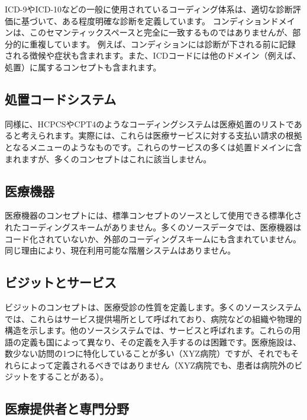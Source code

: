 \documentclass[
  11pt]{book}
\theoremstyle{definition}
\theoremstyle{definition}
\theoremstyle{definition}
\theoremstyle{definition}
\theoremstyle{remark}
\begin{document}
ICD-9やICD-10などの一般に使用されているコーディング体系は、適切な診断評価に基づいて、ある程度明確な診断を定義しています。 コンディションドメインは、このセマンティックスペースと完全に一致するものではありませんが、部分的に重複しています。 例えば、コンディションには診断が下される前に記録される徴候や症状も含まれます。また、ICDコードには他のドメイン（例えば、処置）に属するコンセプトも含まれます。

\subsection{処置コードシステム}\label{ux51e6ux7f6eux30b3ux30fcux30c9ux30b7ux30b9ux30c6ux30e0}

同様に、HCPCSやCPT4のようなコーディングシステムは医療処置のリストであると考えられます。実際には、これらは医療サービスに対する支払い請求の根拠となるメニューのようなものです。これらのサービスの多くは処置ドメインに含まれますが、多くのコンセプトはこれに該当しません。

\subsection{医療機器}\label{ux533bux7642ux6a5fux5668}

医療機器のコンセプトには、標準コンセプトのソースとして使用できる標準化されたコーディングスキームがありません。多くのソースデータでは、医療機器はコード化されていないか、外部のコーディングスキームにも含まれていません。同じ理由により、現在利用可能な階層システムはありません。

\subsection{ビジットとサービス}\label{ux30d3ux30b8ux30c3ux30c8ux3068ux30b5ux30fcux30d3ux30b9}

ビジットのコンセプトは、医療受診の性質を定義します。多くのソースシステムでは、これらはサービス提供場所として呼ばれており、病院などの組織や物理的構造を示します。他のソースシステムでは、サービスと呼ばれます。これらの用語の定義も国によって異なり、その定義を入手するのは困難です。医療施設は、数少ない訪問の1つに特化していることが多い（XYZ病院）ですが、それでもそれらによって定義されるべきではありません（XYZ病院でも、患者は病院外のビジットをすることがある）。

\subsection{医療提供者と専門分野}\label{ux533bux7642ux63d0ux4f9bux8005ux3068ux5c02ux9580ux5206ux91ce}
\end{document}
